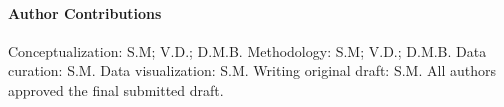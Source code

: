 \documentclass[journal=gmj]{CUP-JNL-DTM}%
\theoremstyle{definition}
\numberwithin{equation}{section}
\begin{document}
\begin{Backmatter}
\paragraph{Author Contributions}
Conceptualization: S.M; V.D.; D.M.B. Methodology: S.M; V.D.; D.M.B. Data curation: S.M. Data visualization: S.M. Writing original draft: S.M. All authors approved the final submitted draft.





\end{Backmatter}
\end{document}
